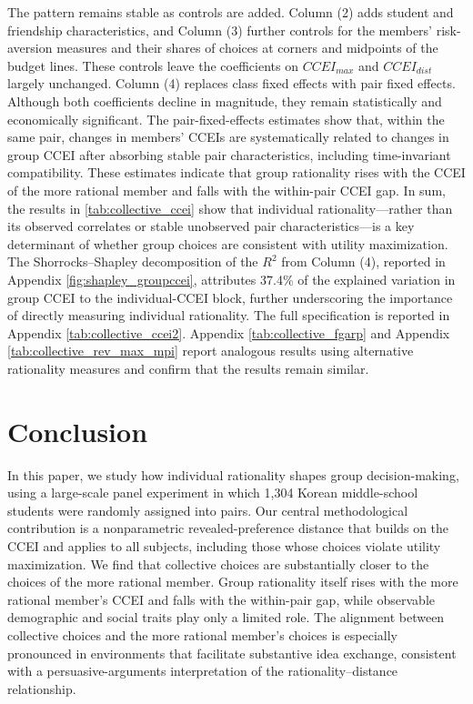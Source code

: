 \documentclass[11 pt]{article}
\begin{document}
The pattern remains stable as controls are added. Column (2) adds student and friendship characteristics, and Column (3) further controls for the members' risk-aversion measures and their shares of choices at corners and midpoints of the budget lines. These controls leave the coefficients on $CCEI_{max}$ and $CCEI_{dist}$ largely unchanged. Column (4) replaces class fixed effects with pair fixed effects. Although both coefficients decline in magnitude, they remain statistically and economically significant. The pair-fixed-effects estimates show that, within the same pair, changes in members' CCEIs are systematically related to changes in group CCEI after absorbing stable pair characteristics, including time-invariant compatibility. These estimates indicate that group rationality rises with the CCEI of the more rational member and falls with the within-pair CCEI gap. In sum, the results in \autoref{tab:collective_ccei} show that individual rationality—rather than its observed correlates or stable unobserved pair characteristics—is a key determinant of whether group choices are consistent with utility maximization. The Shorrocks--Shapley decomposition of the $R^2$ from Column (4), reported in Appendix \autoref{fig:shapley_groupccei}, attributes 37.4\% of the explained variation in group CCEI to the individual-CCEI block, further underscoring the importance of directly measuring individual rationality. The full specification is reported in Appendix \autoref{tab:collective_ccei2}. Appendix \autoref{tab:collective_fgarp} and Appendix \autoref{tab:collective_rev_max_mpi} report analogous results using alternative rationality measures and confirm that the results remain similar.



\section{Conclusion}\label{section:conclusion}

In this paper, we study how individual rationality shapes group decision-making, using a large-scale panel experiment in which 1,304 Korean middle-school students were randomly assigned into pairs. Our central methodological contribution is a nonparametric revealed-preference distance that builds on the CCEI and applies to all subjects, including those whose choices violate utility maximization. We find that collective choices are substantially closer to the choices of the more rational member. Group rationality itself rises with the more rational member's CCEI and falls with the within-pair gap, while observable demographic and social traits play only a limited role. The alignment between collective choices and the more rational member's choices is especially pronounced in environments that facilitate substantive idea exchange, consistent with a persuasive-arguments interpretation of the rationality--distance relationship.
\end{document}
